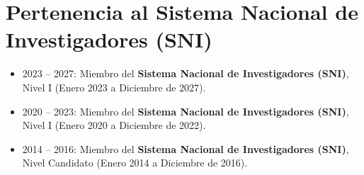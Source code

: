 \documentclass[letterpaper,10pt]{article}
\newcounter{num}
\begin{document}
\section{Pertenencia al Sistema Nacional de Investigadores (SNI)}
 \begin{itemize}[leftmargin=0.15in, label={}]
\item 2023 -- 2027: Miembro del \textbf{Sistema Nacional de Investigadores (SNI)}, Nivel I (Enero 2023 a Diciembre de 2027). 
\item 2020 -- 2023: Miembro del \textbf{Sistema Nacional de Investigadores (SNI)}, Nivel I (Enero 2020 a Diciembre de 2022). 
\item 2014 -- 2016: Miembro del \textbf{Sistema Nacional de Investigadores (SNI)}, Nivel Candidato (Enero 2014 a Diciembre de 2016). 
 \end{itemize}
\end{document}
